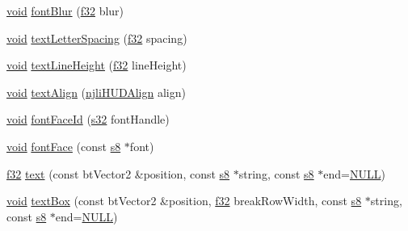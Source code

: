 \begin{DoxyCompactItemize}
\item 
\mbox{\hyperlink{_thread_8h_af1e856da2e658414cb2456cb6f7ebc66}{void}} \mbox{\hyperlink{classnjli_1_1_world_h_u_d_ac2e332b4befffbab6b44e2ea61ad0911}{font\+Blur}} (\mbox{\hyperlink{_util_8h_a5f6906312a689f27d70e9d086649d3fd}{f32}} blur)
\item 
\mbox{\hyperlink{_thread_8h_af1e856da2e658414cb2456cb6f7ebc66}{void}} \mbox{\hyperlink{classnjli_1_1_world_h_u_d_ae618850d43566bb0e3d28e18a1b36037}{text\+Letter\+Spacing}} (\mbox{\hyperlink{_util_8h_a5f6906312a689f27d70e9d086649d3fd}{f32}} spacing)
\item 
\mbox{\hyperlink{_thread_8h_af1e856da2e658414cb2456cb6f7ebc66}{void}} \mbox{\hyperlink{classnjli_1_1_world_h_u_d_a4aefcaeea459b42c7727d301db80ed4c}{text\+Line\+Height}} (\mbox{\hyperlink{_util_8h_a5f6906312a689f27d70e9d086649d3fd}{f32}} line\+Height)
\item 
\mbox{\hyperlink{_thread_8h_af1e856da2e658414cb2456cb6f7ebc66}{void}} \mbox{\hyperlink{classnjli_1_1_world_h_u_d_a2e6124ce2225018131836b7eafd1d571}{text\+Align}} (\mbox{\hyperlink{namespacenjli_a376c3102aef4710f2b54a545bf0e2b3a}{njli\+H\+U\+D\+Align}} align)
\item 
\mbox{\hyperlink{_thread_8h_af1e856da2e658414cb2456cb6f7ebc66}{void}} \mbox{\hyperlink{classnjli_1_1_world_h_u_d_aa6e14180c1643291e14b129eee1a6be3}{font\+Face\+Id}} (\mbox{\hyperlink{_util_8h_aa62c75d314a0d1f37f79c4b73b2292e2}{s32}} font\+Handle)
\item 
\mbox{\hyperlink{_thread_8h_af1e856da2e658414cb2456cb6f7ebc66}{void}} \mbox{\hyperlink{classnjli_1_1_world_h_u_d_a2e000d08f0aacae74231570760f0c7d9}{font\+Face}} (const \mbox{\hyperlink{_util_8h_a2ff401e087cf786c38a6812723e94473}{s8}} $\ast$font)
\item 
\mbox{\hyperlink{_util_8h_a5f6906312a689f27d70e9d086649d3fd}{f32}} \mbox{\hyperlink{classnjli_1_1_world_h_u_d_a0bab9dfc4848ec90b66fb3757c51f4b2}{text}} (const bt\+Vector2 \&position, const \mbox{\hyperlink{_util_8h_a2ff401e087cf786c38a6812723e94473}{s8}} $\ast$string, const \mbox{\hyperlink{_util_8h_a2ff401e087cf786c38a6812723e94473}{s8}} $\ast$end=\mbox{\hyperlink{_util_8h_a070d2ce7b6bb7e5c05602aa8c308d0c4}{N\+U\+LL}})
\item 
\mbox{\hyperlink{_thread_8h_af1e856da2e658414cb2456cb6f7ebc66}{void}} \mbox{\hyperlink{classnjli_1_1_world_h_u_d_a586a73295c4bf59ffe62642155b96a18}{text\+Box}} (const bt\+Vector2 \&position, \mbox{\hyperlink{_util_8h_a5f6906312a689f27d70e9d086649d3fd}{f32}} break\+Row\+Width, const \mbox{\hyperlink{_util_8h_a2ff401e087cf786c38a6812723e94473}{s8}} $\ast$string, const \mbox{\hyperlink{_util_8h_a2ff401e087cf786c38a6812723e94473}{s8}} $\ast$end=\mbox{\hyperlink{_util_8h_a070d2ce7b6bb7e5c05602aa8c308d0c4}{N\+U\+LL}})

\end{DoxyCompactItemize}
